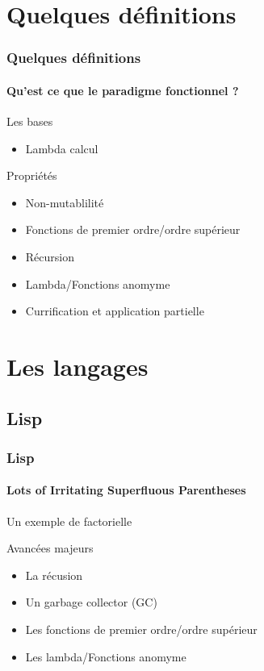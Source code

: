 \documentclass[t,12pt]{beamer}
\begin{document}
\section{Quelques définitions}
\begin{frame}
  \frametitle{Quelques définitions}
  \framesubtitle{Qu'est ce que le paradigme fonctionnel ?}

  \begin{block}{Les bases}
    \begin{itemize}
      \item Lambda calcul
    \end{itemize}
  \end{block}

  \begin{block}{Propriétés}
    \begin{itemize}
      \item Non-mutablilité
      \item Fonctions de premier ordre/ordre supérieur
      \item Récursion
      \item Lambda/Fonctions anomyme
      \item Currification et application partielle
    \end{itemize}
  \end{block}

\end{frame}

\section{Les langages}
\subsection{Lisp}
\begin{frame}
  \frametitle{Lisp}
  \framesubtitle{Lots of Irritating Superfluous Parentheses}

  \begin{exampleblock}{Un exemple de factorielle}
    \lispFact
  \end{exampleblock}

  \begin{block}{Avancées majeurs}
    \begin{itemize}
      \item La récusion
      \item Un garbage collector (GC)
      \item Les fonctions de premier ordre/ordre supérieur
      \item Les lambda/Fonctions anomyme
    \end{itemize}
  \end{block}
\end{frame}
\end{document}
